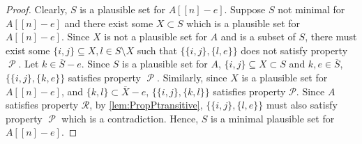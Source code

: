 \documentclass[11pt,letterpaper]{article}
\newcommand{\comp}[1]{\overline{#1}}
\newcommand{\rc}[1]{\textcolor{blue}{\guillemotleft \textbf{Roshan:} #1\guillemotright}}
\newtheorem{claim}{Claim}[section]
\DeclareMathOperator{\calP}{\mathcal{P}}
\newcommand{\pp}[2]{\{\{#1\},\{#2\}\}}
\newcommand{\prop}{\mathcal{R}}
\begin{document}
{{{%
\begin{proof}
Clearly, $S$ is a plausible set for $A[[n]-e]$. Suppose $S$ not minimal for $A[[n]-e]$ and there exist some $X\subset S$ which is a plausible set for $A[[n]-e]$. Since $X$ is not a plausible set for $A$ and is a subset of $S$, there must exist some $\{i,j\}\subseteq X, l\in S\setminus X$ such that $\pp{i,j}{l,e}$ does not satisfy property $\calP$. Let $k\in \comp{S}-e$. Since $S$ is a plausible set for $A$, $\{i,j\}\subseteq X\subset S$ and $k,e\in \comp{S}$, $\pp{i,j}{k,e}$ satisfies property $\calP$. Similarly, since $X$ is a plausible set for $A[[n]-e]$, and $\{k,l\}\subset \comp{X}-e$, $\pp{i,j}{k,l}$ satisfies property $\mathcal{P}$. Since $A$ satisfies property $\prop$, by \cref{lem:PropPtransitive}, $\pp{i,j}{l,e}$ must also satisfy property $\calP$ which is a contradiction. Hence, $S$ is a minimal plausible set for $A[[n]-e]$.
\end{proof}

}}}
\end{document}

